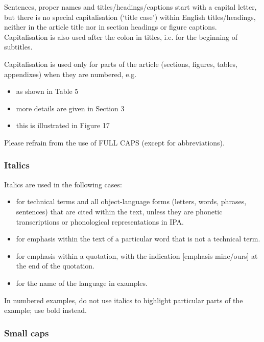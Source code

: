 \documentclass[charis,linguex]{glossa}
\begin{document}
Sentences, proper names and titles/headings/captions start with a capital letter, but there is no special capitalisation (`title case') within English titles/headings, neither in the article title nor in section headings or figure captions. Capitalisation is also used after the colon in titles, i.e. for the beginning of subtitles.

Capitalisation is used only for parts of the article (sections, figures, tables, appendixes) when they are numbered, e.g.
\begin{itemize}
\item as shown in Table 5
\item more details are given in Section 3
\item this is illustrated in Figure 17
\end{itemize}

Please refrain from the use of FULL CAPS (except for abbreviations).

\subsubsection{Italics}
Italics are used in the following cases:
\sloppy
\begin{itemize}
\item for technical terms and all object-language forms (letters, words, phrases, sentences) that are cited within the text, unless they are phonetic transcriptions or phonological representations in IPA.
\item for emphasis within the text of a particular word that is not a technical term.
\item for emphasis within a quotation, with the indication [emphasis mine/ours] at the end of the quotation.
\item for the name of the language in examples.
\end{itemize}

In numbered examples, do not use italics to highlight particular parts of the example; use bold instead.

\fussy

\subsubsection{Small caps} 
\end{document}
